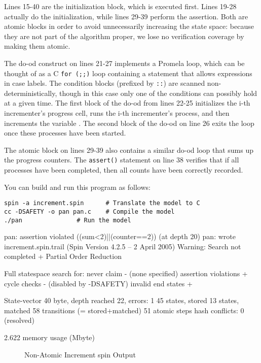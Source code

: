 Lines 15-40 are the initialization block, which is executed first.
Lines 19-28 actually do the initialization, while lines 29-39
perform the assertion.
Both are atomic blocks in order to avoid unnecessarily increasing
the state space: because they are not part of the algorithm proper,
we lose no verification coverage by making them atomic.

The do-od construct on lines 21-27 implements a Promela loop,
which can be thought of as a C {\tt for (;;)} loop containing a
 statement that allows expressions in case labels.
The condition blocks (prefixed by {\tt ::})
are scanned non-deterministically,
though in this case only one of the conditions can possibly hold at a given
time.
The first block of the do-od from lines 22-25 initializes the i-th
incrementer's progress cell, runs the i-th incrementer's process, and
then increments the variable .
The second block of the do-od on line 26 exits the loop once
these processes have been started.

The atomic block on lines 29-39 also contains a similar do-od
loop that sums up the progress counters.
The {\tt assert()} statement on line 38 verifies that if all processes
have been completed, then all counts have been correctly recorded.

You can build and run this program as follows:

\vspace{5pt}
\begin{minipage}[t]{\columnwidth}
\scriptsize
\begin{verbatim}
spin -a increment.spin		# Translate the model to C
cc -DSAFETY -o pan pan.c	# Compile the model
./pan				# Run the model
\end{verbatim}
\end{minipage}
\vspace{5pt}

{ \scriptsize
\begin{verbbox}
pan: assertion violated ((sum<2)||(counter==2)) (at depth 20)
pan: wrote increment.spin.trail
(Spin Version 4.2.5 -- 2 April 2005)
Warning: Search not completed
        + Partial Order Reduction

Full statespace search for:
        never claim             - (none specified)
        assertion violations    +
        cycle checks            - (disabled by -DSAFETY)
        invalid end states      +

State-vector 40 byte, depth reached 22, errors: 1
      45 states, stored
      13 states, matched
      58 transitions (= stored+matched)
      51 atomic steps
hash conflicts: 0 (resolved)

2.622  memory usage (Mbyte)
\end{verbbox}
}
\begin{figure*}[tbp]
\centering
\theverbbox
\caption{Non-Atomic Increment spin Output}
\label{fig:analysis:Non-Atomic Increment spin Output}
\end{figure*}

